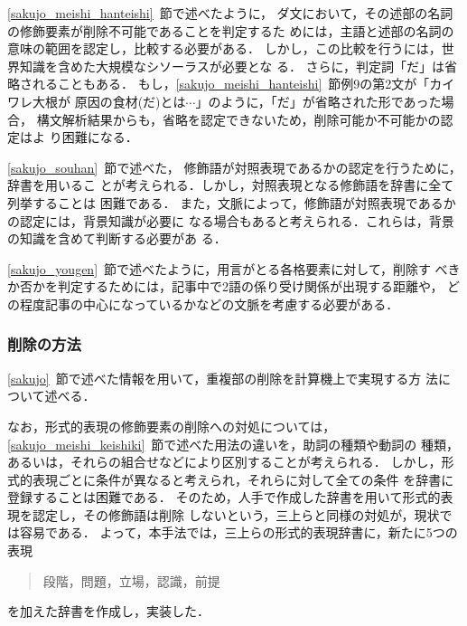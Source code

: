 \vspace{2ex}


\ref{sakujo_meishi_hanteishi}~節で述べたように，
ダ文において，その述部の名詞の修飾要素が削除不可能であることを判定するた
めには，主語と述部の名詞の意味の範囲を認定し，比較する必要がある．
しかし，この比較を行うには，世界知識を含めた大規模なシソーラスが必要とな
る．
さらに，判定詞「だ」は省略されることもある．
もし，\ref{sakujo_meishi_hanteishi}~節例9の第2文が「カイワレ大根が
原因の食材(だ)とは$\cdots$」のように，「だ」が省略された形であった場合，
構文解析結果からも，省略を認定できないため，削除可能か不可能かの認定はよ
り困難になる．

\vspace{2ex}


\ref{sakujo_souhan}~節で述べた，
修飾語が対照表現であるかの認定を行うために，辞書を用いるこ
とが考えられる．しかし，対照表現となる修飾語を辞書に全て列挙することは
困難である．
また，文脈によって，修飾語が対照表現であるかの認定には，背景知識が必要に
なる場合もあると考えられる．これらは，背景の知識を含めて判断する必要があ
る．

\vspace{2ex}


\ref{sakujo_yougen}~節で述べたように，用言がとる各格要素に対して，削除す
べきか否かを判定するためには，記事中で2語の係り受け関係が出現する距離や，
どの程度記事の中心になっているかなどの文脈を考慮する必要がある．

\subsubsection{削除の方法} \label{jitsu_sakujo_houhou} 
\ref{sakujo}~節で述べた情報を用いて，重複部の削除を計算機上で実現する方
法について述べる．

なお，形式的表現の修飾要素の削除への対処については，
\ref{sakujo_meishi_keishiki}~節で述べた用法の違いを，助詞の種類や動詞の
種類，あるいは，それらの組合せなどにより区別することが考えられる．
しかし，形式的表現ごとに条件が異なると考えられ，それらに対して全ての条件
を辞書に登録することは困難である．
そのため，人手で作成した辞書を用いて形式的表現を認定し，その修飾語は削除
しないという，三上ら\cite{mikami99}と同様の対処が，現状では容易である．
よって，本手法では，三上らの形式的表現辞書に，新たに5つの表現
\begin{quote}
段階，問題，立場，認識，前提
\end{quote}
を加えた辞書を作成し，実装した．

